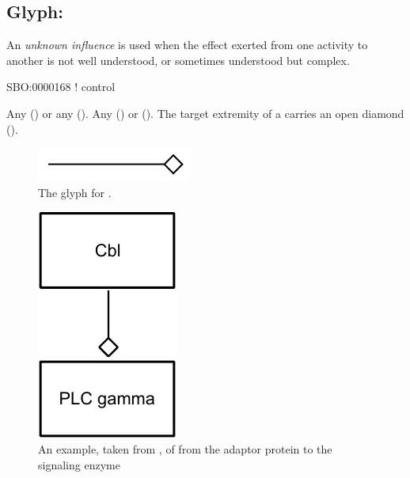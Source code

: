\subsection{Glyph: }
\label{sec:af:unknown_infl}

An \emph{unknown influence} is used when the effect exerted from one activity to another is not well understood, or sometimes understood but complex.

\begin{glyphDescription}

\glyphSboTerm SBO:0000168 ! control

 \glyphOrigin Any  () or any  ().
 \glyphTarget Any  () or  ().
 \glyphEndPoint The target extremity of a  carries an open diamond ().

\end{glyphDescription}

\begin{figure}[H]
  \centering
  \includegraphics[width = 2in]{images/build/unknownInfluence.pdf}
  \caption{The \AF glyph for .}
  \label{fig:af:unknownInfl}
\end{figure}

\begin{figure}[H]
  \centering
  \includegraphics[scale = 1]{src/images/build/unknown_influence_example.pdf}
  \caption{An example, taken from , of  from the adaptor protein  to the signaling enzyme }
  \label{fig:af:exPI}
\end{figure} 

